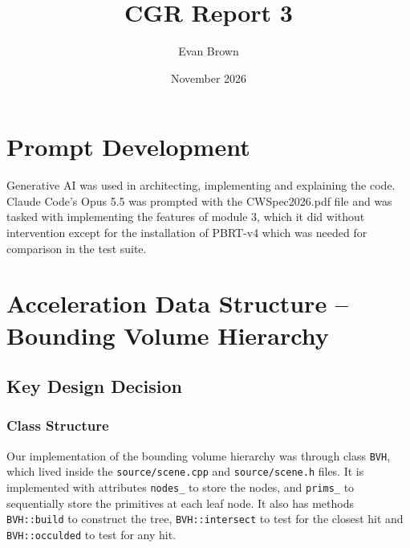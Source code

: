 \documentclass{article}
\title{CGR Report 3}
\author{Evan Brown}
\date{November 2026}
\begin{document}
\maketitle

\section*{Prompt Development}
Generative AI was used in architecting, implementing and explaining the code. Claude Code's Opus 5.5 was prompted with the CWSpec2026.pdf file and was tasked with implementing the features of module 3, which it did without intervention except for the installation of PBRT-v4 which was needed for comparison in the test suite.

\section{Acceleration Data Structure -- Bounding Volume Hierarchy}

\subsection{Key Design Decision}

\subsubsection{Class Structure}
Our implementation of the bounding volume hierarchy was through class \verb|BVH|, which lived inside the \verb|source/scene.cpp| and \verb|source/scene.h| files. It is implemented with attributes \verb|nodes_| to store the nodes, and \verb|prims_| to sequentially store the primitives at each leaf node. It also has methods \verb|BVH::build| to construct the tree, \verb|BVH::intersect| to test for the closest hit and \verb|BVH::occulded| to test for any hit.
\end{document}
